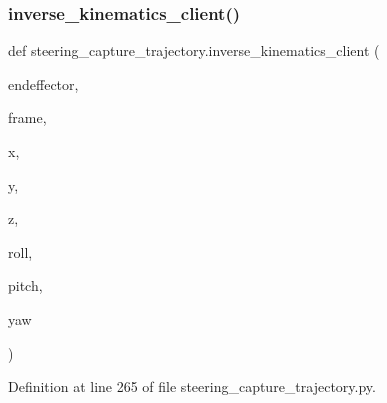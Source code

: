 \mbox{\label{namespacesteering__capture__trajectory_a4bfce21cb55ab2e49bfd284ede718f63}} 
\subsubsection{\texorpdfstring{inverse\_kinematics\_client()}{inverse\_kinematics\_client()}}
{\footnotesize\ttfamily def steering\+\_\+capture\+\_\+trajectory.\+inverse\+\_\+kinematics\+\_\+client (\begin{DoxyParamCaption}\item[{}]{endeffector,  }\item[{}]{frame,  }\item[{}]{x,  }\item[{}]{y,  }\item[{}]{z,  }\item[{}]{roll,  }\item[{}]{pitch,  }\item[{}]{yaw }\end{DoxyParamCaption})}



Definition at line 265 of file steering\+\_\+capture\+\_\+trajectory.\+py.



